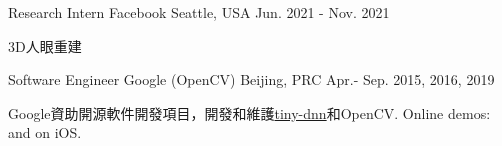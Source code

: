 


\begin{cventries}

\cventry
{Research Intern} %
{Facebook} %
{Seattle, USA} %
{Jun. 2021 - Nov. 2021} %
{ %
\begin{cvitems}
\item {3D人眼重建}
\end{cvitems}
}

\cventry
{Software Engineer} %
{Google (OpenCV)} %
{Beijing, PRC} %
{Apr.- Sep. 2015, 2016, 2019} %
{ %
\begin{cvitems}
\item {Google資助開源軟件開發項目，開發和維護\href{https://github.com/tiny-dnn/tiny-dnn}{tiny-dnn}和OpenCV. Online demos: \href{https://www.youtube.com/watch?v=Mc20rTYdXTE}{} and \href{https://drive.google.com/open?id=0B-RYa1FDOrYXVUEzcG1mdnl5a3M}{} on iOS.
}
\end{cvitems}
}


\end{cventries}

